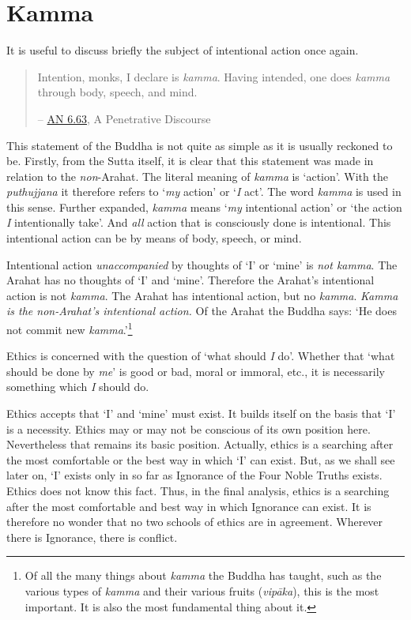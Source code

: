 \chapter{Kamma}

It is useful to discuss briefly the subject of intentional action once again.

\begin{quote}
Intention, monks, I declare is \textit{kamma}. Having intended, one does \textit{kamma} through body, speech, and mind.

 -- \href{https://suttacentral.net/an6.63/en/thanissaro}{AN 6.63}, A Penetrative Discourse
\end{quote}

This statement of the Buddha is not quite as simple as it is usually reckoned to be. Firstly, from the Sutta itself, it is clear that this statement was made in relation to the \emph{non}-Arahat. The literal meaning of \textit{kamma} is `action'. With the \textit{puthujjana} it therefore refers to `\emph{my} action' or `\emph{I} act'. The word \textit{kamma} is used in this sense. Further expanded, \textit{kamma} means `\emph{my} intentional action' or `the action \emph{I} intentionally take'. And \emph{all} action that is consciously done is intentional. This intentional action can be by means of body, speech, or mind.

Intentional action \emph{unaccompanied} by thoughts of `I' or `mine' is \emph{not kamma}. The Arahat has no thoughts of `I' and `mine'. Therefore the Arahat's intentional action is not \textit{kamma}. The Arahat has intentional action, but no \textit{kamma}. \emph{Kamma is the non-Arahat's intentional action.} Of the Arahat the Buddha says: `He does not commit new \textit{kamma}.'\footnote{Of all the many things about \textit{kamma} the Buddha has taught, such as the various types of \textit{kamma} and their various fruits (\textit{vipāka}), this is the most important. It is also the most fundamental thing about it.}

Ethics is concerned with the question of `what should \emph{I} do'. Whether that `what should be done by \emph{me}' is good or bad, moral or immoral, etc., it is necessarily something which \emph{I} should do.

Ethics accepts that `I' and `mine' must exist. It builds itself on the basis that `I' is a necessity. Ethics may or may not be conscious of its own position here. Nevertheless that remains its basic position. Actually, ethics is a searching after the most comfortable or the best way in which `I' can exist. But, as we shall see later on, `I' exists only in so far as Ignorance of the Four Noble Truths exists. Ethics does not know this fact. Thus, in the final analysis, ethics is a searching after the most comfortable and best way in which Ignorance can exist. It is therefore no wonder that no two schools of ethics are in agreement. Wherever there is Ignorance, there is conflict.

